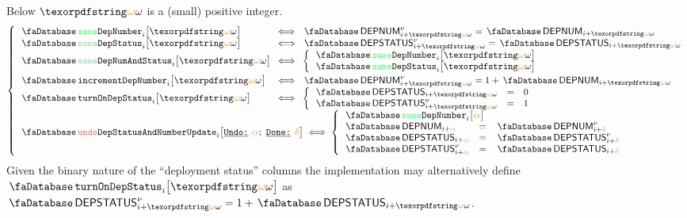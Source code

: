 Below $\relof$ is a (small) positive integer.
\[
	\left\{ \begin{array}{lcl}
		\accSameDeploymentNumber  {i}{\relof} & \!\!\! \iff \!\!\! & \accDeploymentNumber\new_{i + \relof} = \accDeploymentNumber_{i + \relof} \\
		\accSameDeploymentStatus  {i}{\relof} & \!\!\! \iff \!\!\! & \accDeploymentStatus\new_{i + \relof} = \accDeploymentStatus_{i + \relof} \\
		\accSameDeployment        {i}{\relof} & \!\!\! \iff \!\!\! &
		\left\{ \begin{array}{lcl}
			\multicolumn{3}{l}{\accSameDeploymentNumber {i}{\relof} } \\
			\multicolumn{3}{l}{\accSameDeploymentStatus {i}{\relof} } \\
		\end{array} \right. \vspace{1mm} \\
		\accIncrementDeploymentNumber  {i}{\relof} & \!\!\! \iff \!\!\! & \accDeploymentNumber\new_{i + \relof} = 1 + \accDeploymentNumber_{i + \relof} \\
		\accTurnOnDepStatus            {i}{\relof} & \!\!\! \iff \!\!\! &
		\left\{ \begin{array}{lcl}
			\accDeploymentStatus      _{i + \relof} & = & 0 \\
			\accDeploymentStatus\new  _{i + \relof} & = & 1 \\
		\end{array} \right. \\
		\multicolumn{3}{l}{
			\accUndoDeploymentStatusAndNumberUpdate {i}{\reluo}{\reldo} \iff
			\left\{ \begin{array}{lcl}
				\multicolumn{3}{l}{\accSameDeploymentNumber {i}{\reluo}} \\
				\accDeploymentNumber   _{i + \reluo} & = & \accDeploymentNumber\new   _{i + \reldo} \\
				\accDeploymentStatus          _{i + \reluo} & = & \accDeploymentStatus\new   _{i + \reldo} \\
				\accDeploymentStatus\new      _{i + \reluo} & = & \accDeploymentStatus       _{i + \reldo} \\
			\end{array} \right. } \\
	\end{array} \right.
\]
\saNote{}
Given the binary nature of the ``deployment status'' columns
the implementation may alternatively define $\accTurnOnDepStatus {i}{\relof}$
as $\accDeploymentStatus\new _{i + \relof} = 1 + \accDeploymentStatus _{i + \relof}$.

